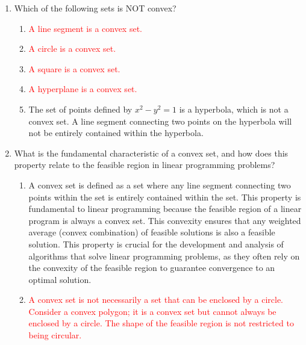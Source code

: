 \documentclass{article}%
\newcommand{\incorrect}[1]{\textcolor{red}{#1}}
\begin{document}
\begin{enumerate}
\begin{enumerate}
\item \incorrect{This is incorrect because S is a convex set.}%
\item \incorrect{The convex hull is independent of whether the origin is included.}%
\item \incorrect{The question is about whether the convex hull of S is equal to S.  The fact that S is convex is sufficient to answer the question.}%
\item \incorrect{The dimension of the space is irrelevant since S is already defined in $\mathbb{R}^2$.}%
\end{enumerate}%
\vspace{1em}%
\item Which of the following sets is NOT convex?%
\begin{enumerate}%
\item \incorrect{A line segment is a convex set.}%
\item \incorrect{A circle is a convex set.}%
\item \incorrect{A square is a convex set.}%
\item \incorrect{A hyperplane is a convex set.}%
\item The set of points defined by $x^2 - y^2 = 1$ is a hyperbola, which is not a convex set.  A line segment connecting two points on the hyperbola will not be entirely contained within the hyperbola.%
\end{enumerate}%
\vspace{1em}%
\item What is the fundamental characteristic of a convex set, and how does this property relate to the feasible region in linear programming problems?%
\begin{enumerate}%
\item A convex set is defined as a set where any line segment connecting two points within the set is entirely contained within the set. This property is fundamental to linear programming because the feasible region of a linear program is always a convex set.  This convexity ensures that any weighted average (convex combination) of feasible solutions is also a feasible solution. This property is crucial for the development and analysis of algorithms that solve linear programming problems, as they often rely on the convexity of the feasible region to guarantee convergence to an optimal solution.%
\item \incorrect{A convex set is not necessarily a set that can be enclosed by a circle.  Consider a convex polygon; it is a convex set but cannot always be enclosed by a circle. The shape of the feasible region is not restricted to being circular.}%

\end{enumerate}
\end{enumerate}
\end{document}
